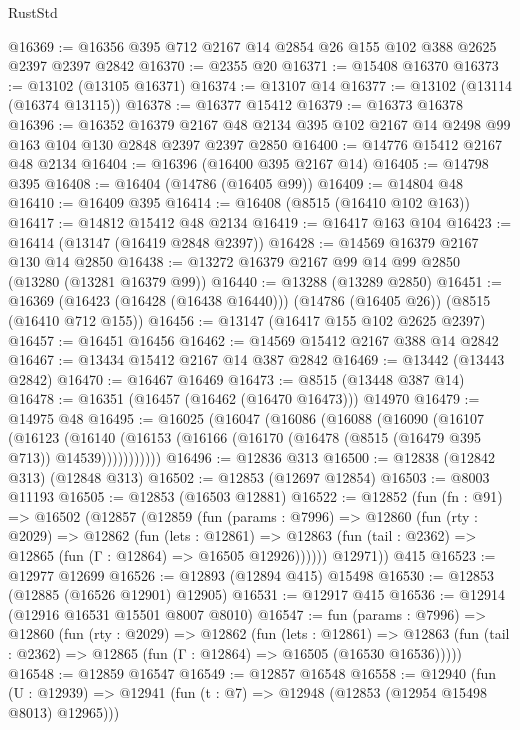 \begin{lexlean}{RustStd}
\begin{coremodule}
@16369 := @16356 @395 @712 @2167 @14 @2854 @26 @155 @102 @388 @2625 @2397 @2397 @2842
@16370 := @2355 @20
@16371 := @15408 @16370
@16373 := @13102 (@13105 @16371)
@16374 := @13107 @14
@16377 := @13102 (@13114 (@16374 @13115))
@16378 := @16377 @15412
@16379 := @16373 @16378
@16396 := @16352
    @16379
    @2167
    @48
    @2134
    @395
    @102
    @2167
    @14
    @2498
    @99
    @163
    @104
    @130
    @2848
    @2397
    @2397
    @2850
@16400 := @14776 @15412 @2167 @48 @2134
@16404 := @16396 (@16400 @395 @2167 @14)
@16405 := @14798 @395
@16408 := @16404 (@14786 (@16405 @99))
@16409 := @14804 @48
@16410 := @16409 @395
@16414 := @16408 (@8515 (@16410 @102 @163))
@16417 := @14812 @15412 @48 @2134
@16419 := @16417 @163 @104
@16423 := @16414 (@13147 (@16419 @2848 @2397))
@16428 := @14569 @16379 @2167 @130 @14 @2850
@16438 := @13272 @16379 @2167 @99 @14 @99 @2850 (@13280 (@13281 @16379 @99))
@16440 := @13288 (@13289 @2850)
@16451 := @16369 (@16423 (@16428 (@16438 @16440))) (@14786 (@16405 @26)) (@8515 (@16410 @712 @155))
@16456 := @13147 (@16417 @155 @102 @2625 @2397)
@16457 := @16451 @16456
@16462 := @14569 @15412 @2167 @388 @14 @2842
@16467 := @13434 @15412 @2167 @14 @387 @2842
@16469 := @13442 (@13443 @2842)
@16470 := @16467 @16469
@16473 := @8515 (@13448 @387 @14)
@16478 := @16351 (@16457 (@16462 (@16470 @16473))) @14970
@16479 := @14975 @48
@16495 := @16025
    (@16047
      (@16086
        (@16088
          (@16090
            (@16107
              (@16123
                (@16140 (@16153 (@16166 (@16170 (@16478 (@8515 (@16479 @395 @713)) @14539)))))))))))
@16496 := @12836 @313
@16500 := @12838 (@12842 @313) (@12848 @313)
@16502 := @12853 (@12697 @12854)
@16503 := @8003 @11193
@16505 := @12853 (@16503 @12881)
@16522 := @12852
    (fun (fn : @91) =>
    @16502
      (@12857
        (@12859
          (fun (params : @7996) =>
          @12860
            (fun (rty : @2029) =>
            @12862
              (fun (lets : @12861) =>
              @12863 (fun (tail : @2362) => @12865 (fun (Γ : @12864) => @16505 @12926))))))
        @12971))
    @415
@16523 := @12977 @12699
@16526 := @12893 (@12894 @415) @15498
@16530 := @12853 (@12885 (@16526 @12901) @12905)
@16531 := @12917 @415
@16536 := @12914 (@12916 @16531 @15501 @8007 @8010)
@16547 := fun (params : @7996) =>
  @12860
    (fun (rty : @2029) =>
    @12862
      (fun (lets : @12861) =>
      @12863 (fun (tail : @2362) => @12865 (fun (Γ : @12864) => @16505 (@16530 @16536)))))
@16548 := @12859 @16547
@16549 := @12857 @16548
@16558 := @12940
    (fun (U : @12939) => @12941 (fun (t : @7) => @12948 (@12853 (@12954 @15498 @8013) @12965)))

\end{coremodule}
\end{lexlean}
